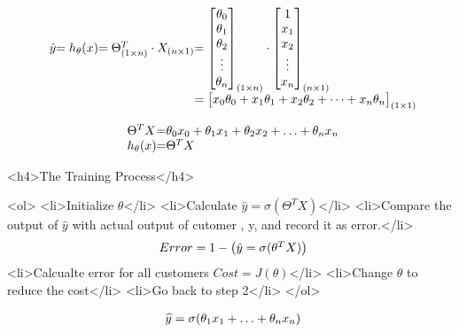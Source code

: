 			\[
			\begin{array}{ l@{} l@{} l@{} l@{} } 
			\hat{y}
			& = h_\theta (x)
			& = \Theta_{(1 \times n)}^{T} \cdot X_{(n \times 1)} 
			& = 
			\begin{bmatrix} 
				\theta_0 \\
				\theta_1 \\
				\theta_2 \\
				\vdots \\
				\theta_n \\ 
			\end{bmatrix}_{(1 \times n)} 
			\cdot 
			\begin{bmatrix} 
				1 \\
				x_1 \\
				x_2 \\
				\vdots \\
				x_n \\ 
			\end{bmatrix}_{(n \times 1)} 
			\\ 
			& & & =
			\begin{bmatrix} 
				x_0\theta_0 +
				x_1\theta_1 +
				x_2\theta_2 +
				\cdots +
				x_n\theta_n \\ 
			\end{bmatrix}_{(1 \times 1)} 
			\end{array}
			\] 

\[
	\begin{array}{ l@{} l@{} l@{}} 
		\Theta^T X & = & \theta_0 x_0 + \theta_1 x_1 + \theta_2 x_2 + \ldots +
		\theta_n x_n \\
		h_\theta (x) & = & \Theta^T X \\ 
	\end{array}
\]

<h4>The Training Process</h4>

<ol>
	<li>Initialize $\theta$</li>
	<li>Calculate $ \hat{y} = \sigma(\Theta^{T} X)$</li>
	<li>Compare the output of $\hat{y}$ with actual output of cutomer , y, and
		record it as error.</li>
	\[
		\begin{array}{ l@{} l@{} } 
			Error = 1 - 
			\left(
				\hat{y} = \sigma(\theta^{T} X)
			\right)
		\end{array}
	\]
	<li>Calcualte error for all customers $Cost = J(\theta)$</li>
	<li>Change $\theta$ to reduce the cost</li>
	<li>Go back to step 2</li>
</ol>

\[
	\begin{array}{ l@{} l@{} } 
	\widehat{y} = \sigma(\theta_1 x_1 + \ldots + \theta_n x_n) 
	\end{array}
\]

